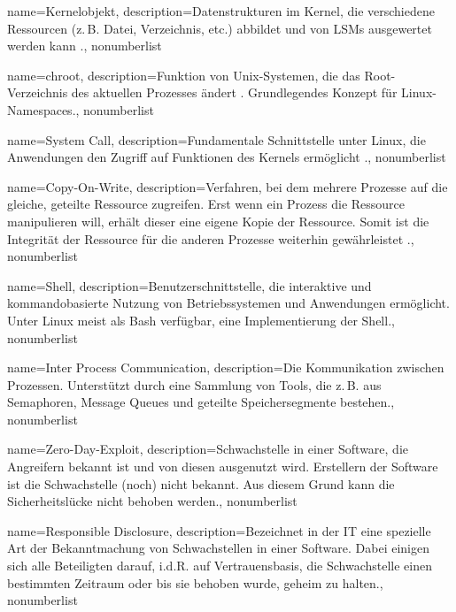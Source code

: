 {%
  name={Kernelobjekt},
  description={Datenstrukturen im Kernel, die verschiedene Ressourcen (z.\,B. Datei, Verzeichnis, etc.) abbildet und von LSMs ausgewertet werden kann \cite{kernelObjects}.},
  nonumberlist
}

{%
  name={chroot},
  description={Funktion von Unix-Systemen, die das Root-Verzeichnis des aktuellen Prozesses ändert \cite{chroot}. Grundlegendes Konzept für Linux-Namespaces.},
  nonumberlist
}

{%
  name={System Call},
  description={Fundamentale Schnittstelle unter Linux, die Anwendungen den Zugriff auf Funktionen des Kernels ermöglicht \cite{systemcall}.},
  nonumberlist
}

{%
  name={Copy-On-Write},
  description={Verfahren, bei dem mehrere Prozesse auf die gleiche, geteilte Ressource zugreifen. Erst wenn ein Prozess die Ressource manipulieren will, erhält dieser eine eigene Kopie der Ressource. Somit ist die Integrität der Ressource für die anderen Prozesse weiterhin gewährleistet \cite{dockerImagesAndContainers}.},
  nonumberlist
}

{%
  name={Shell},
  description={Benutzerschnittstelle, die interaktive und kommandobasierte Nutzung von Betriebssystemen und Anwendungen ermöglicht. Unter Linux meist als Bash verfügbar, eine Implementierung der Shell.},
  nonumberlist
}

{%
  name={Inter Process Communication},
  description={Die Kommunikation zwischen Prozessen. Unterstützt durch eine Sammlung von Tools, die z.\,B. aus Semaphoren, Message Queues und geteilte Speichersegmente bestehen.},
  nonumberlist
}


{%
  name={Zero-Day-Exploit},
  description={Schwachstelle in einer Software, die Angreifern bekannt ist und von diesen ausgenutzt wird. Erstellern der Software ist die Schwachstelle (noch) nicht bekannt. Aus diesem Grund kann die Sicherheitslücke nicht behoben werden.},
  nonumberlist
}

{%
  name={Responsible Disclosure},
  description={Bezeichnet in der IT eine spezielle Art der Bekanntmachung von Schwachstellen in einer Software. Dabei einigen sich alle Beteiligten darauf, i.d.R. auf Vertrauensbasis, die Schwachstelle einen bestimmten Zeitraum oder bis sie behoben wurde, geheim zu halten.},
  nonumberlist
}

